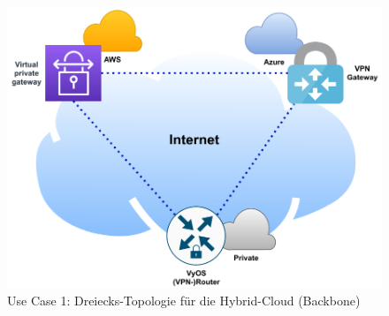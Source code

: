 \begin{figure}[h]
  \centering
  \includegraphics{Figures/Use-Case-1_Basis_Deployment.pdf}
  \caption{Use Case 1: Dreiecks-Topologie für die Hybrid-Cloud (\glqq Backbone\grqq{})}
  \label{grafik:Use-Case-1_Basis_Deployment}
\end{figure}\FloatBarrier

